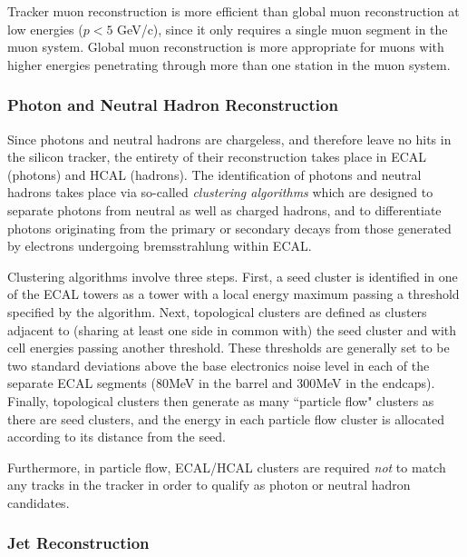 Tracker muon reconstruction is more efficient than global muon reconstruction at low energies ($p < 5$ GeV/c), since it only requires a single muon segment in the muon system. Global muon reconstruction is more appropriate for muons with higher energies penetrating through more than one station in the muon system.


\subsubsection{Photon and Neutral Hadron Reconstruction}

Since photons and neutral hadrons are chargeless, and therefore leave no hits in the silicon tracker, the entirety of their reconstruction takes place in ECAL (photons) and HCAL (hadrons). The identification of photons and neutral hadrons takes place via so-called \emph{clustering algorithms} which are designed to separate photons from neutral as well as charged hadrons, and to differentiate photons originating from the primary or secondary decays from those generated by electrons undergoing bremsstrahlung within ECAL.

Clustering algorithms involve three steps. First, a seed cluster is identified in one of the ECAL towers as a tower with a local energy maximum passing a threshold specified by the algorithm. Next, topological clusters are defined as clusters adjacent to (sharing at least one side in common with) the seed cluster and with cell energies passing another threshold. These thresholds are generally set to be two standard deviations above the base electronics noise level in each of the separate ECAL segments (80MeV in the barrel and 300MeV in the endcaps). Finally, topological clusters then generate as many ``particle flow" clusters as there are seed clusters, and the energy in each particle flow cluster is allocated according to its distance from the seed. 

Furthermore, in particle flow, ECAL/HCAL clusters are required \emph{not} to match any tracks in the tracker in order to qualify as photon or neutral hadron candidates.


\subsubsection{Jet Reconstruction}

